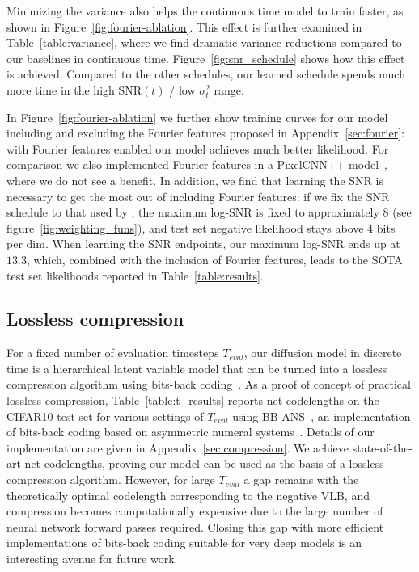 \documentclass{article}
\newcommand{\snr}{\text{SNR}}
\begin{document}
Minimizing the variance also helps the continuous time model to train faster, as shown in Figure~\ref{fig:fourier-ablation}. This effect is further examined in Table~\ref{table:variance}, where we find dramatic variance reductions compared to our baselines in continuous time. Figure~\ref{fig:snr_schedule} shows how this effect is achieved: Compared to the other schedules, our learned schedule spends much more time in the high $\snr(t)$ / low $\sigma^{2}_{t}$ range.




In Figure~\ref{fig:fourier-ablation} we further show training curves for our model including and excluding the Fourier features proposed in Appendix~\ref{sec:fourier}: with Fourier features enabled our model achieves much better likelihood. For comparison we also implemented Fourier features in a PixelCNN++ model~\citep{salimans2017pixelcnn++}, where we do not see a benefit. In addition, we find that learning the SNR is necessary to get the most out of including Fourier features: if we fix the SNR schedule to that used by \cite{ho2020denoising}, the maximum log-SNR is fixed to approximately 8 (see figure~\ref{fig:weighting_funs}), and test set negative likelihood stays above 4 bits per dim. When learning the SNR endpoints, our maximum log-SNR ends up at $13.3$, which, combined with the inclusion of Fourier features, leads to the SOTA test set likelihoods reported in Table~\ref{table:results}.

\subsection{Lossless compression}
For a fixed number of evaluation timesteps $T_{eval}$, our diffusion model in discrete time is a hierarchical latent variable model that can be turned into a lossless compression algorithm using bits-back coding~\citep{hinton1993keeping}. 
As a proof of concept of practical lossless compression, Table~\ref{table:t_results} reports net codelengths on the CIFAR10 test set for various settings of $T_{eval}$ using BB-ANS~\citep{townsend2018practical}, an implementation of bits-back coding based on asymmetric numeral systems~\citep{duda2009asymmetric}. Details of our implementation are given in Appendix~\ref{sec:compression}. We achieve state-of-the-art net codelengths, proving our model can be used as the basis of a lossless compression algorithm. However, for large $T_{eval}$ a gap remains with the theoretically optimal codelength corresponding to the negative VLB, and compression becomes computationally expensive due to the large number of neural network forward passes required. Closing this gap with more efficient implementations of bits-back coding suitable for very deep models is an interesting avenue for future work.
\end{document}
